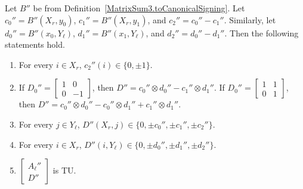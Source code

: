\begin{lemma}
    \label{MatrixSum3.IsCanonicalSigning.Al_D_isTotallyUnimodular}
    \leanok
    Let $B''$ be from Definition~\ref{MatrixSum3.toCanonicalSigning}. Let $c_{0}'' = B'' (X_{r}, y_{0})$, $c_{1}'' = B'' (X_{r}, y_{1})$, and $c_{2}'' = c_{0}'' - c_{1}''$. Similarly, let $d_{0}'' = B'' (x_{0}, Y_{\ell})$, $d_{1}'' = B'' (x_{1}, Y_{\ell})$, and $d_{2}'' = d_{0}'' - d_{1}''$. Then the following statements hold.
    \begin{enumerate}
        \item\label{item:tss_Bp_c2} For every $i \in X_{r}$, $c_{2}'' (i) \in \{0, \pm 1\}$.
        \item\label{item:tss_Bp_Deq} If $D_{0}'' = \begin{bmatrix} 1 & 0 \\ 0 & -1 \end{bmatrix}$, then $D'' = c_{0}'' \otimes d_{0}'' - c_{1}'' \otimes d_{1}''$. If $D_{0}'' = \begin{bmatrix} 1 & 1 \\ 0 & 1 \end{bmatrix}$, then $D'' = c_{0}'' \otimes d_{0}'' - c_{0}'' \otimes d_{1}'' + c_{1}'' \otimes d_{1}''$.
        \item\label{item:tss_Bp_Dcols} For every $j \in Y_{\ell}$, $D'' (X_{r}, j) \in \{0, \pm c_{0}'', \pm c_{1}'', \pm c_{2}''\}$.
        \item\label{item:tss_Bp_Drows} For every $i \in X_{r}$, $D'' (i, Y_{\ell}) \in \{0, \pm d_{0}'', \pm d_{1}'', \pm d_{2}''\}$.
        \item\label{item:tss_Bp_AlD} $\begin{bmatrix} A_{\ell}'' \\ D'' \end{bmatrix}$ is TU.
    \end{enumerate}
\end{lemma}

